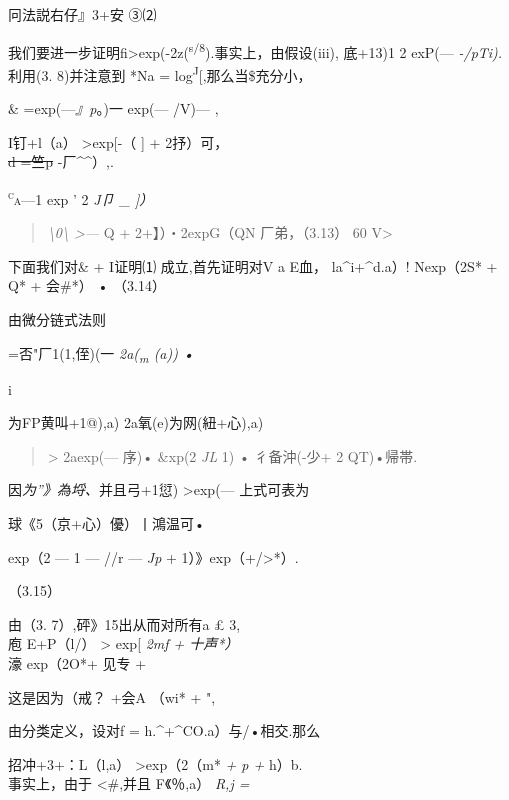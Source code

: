 冋法説右仔』3+安 ③⑵

我们要进一步证明\textbar{}fi\textbar{}\textgreater{}exp(-2z(\textsuperscript{s/8}).事实上，由假设(iii),
底+13)1 2 exP(--- \emph{-/pTi).}利用(3. 8)并注意到 *Na =
log\textsuperscript{J}{[}\textbar{}{]},那么当\$充分小，

\&\textbar{} =exp(---\emph{』p}。)一 exp(--- /V)--- ,

I钉+l（a）\textbar{} \textgreater{}exp{[}-（ {]} + 2抒）可，\\
\sout{d =竺p} -厂\^{}\^{}）,.

\textsc{\textsuperscript{c}a---}1 exp ' 2 \emph{J卩 \_ {]}）}

\begin{quote}
\emph{\textbackslash{}0\textbackslash{} \textgreater{}---} Q +
2+】）・2expG（QN 厂弟，（3.13） 60 V\textgreater{}
\end{quote}

下面我们对\& + I证明⑴ 成立,首先证明对V a E血， la\^{}i+\^{}d.a）!
Nexp（2S* + Q* + 会\#*） • （3.14）

由微分链式法则

=否"厂1(1,侄)(一 \emph{2a(\textsubscript{m} (a)) •}

i

为FP黄叫+1@),a) \textbar{}2a氧(e)为网(紐+心),a) \textbar{}

\begin{quote}
\textgreater{} 2aexp(--- 序)• \&xp(2 \emph{JL} 1) • 彳备沖(-少+ 2
QT)•帰帯.
\end{quote}

因\emph{为''》為埒、}并且\textbar{}弓+1愆)\textbar{}
\textgreater{}exp(--- 上式可表为

\textbar{}球《5（京+心）優）丨鴻温可•

exp（2 --- 1 --- //r --- \emph{Jp} + 1）》exp（+/\textgreater{}*）.

（3.15）

由（3. 7）,砰》15出从而对所有a £ 3,\\
庖 E+P（l/）\textbar{} \textgreater{} exp{[} \emph{2mf + 十声*）\\
}濠 exp（2O*+ 见专 +

这是因为（戒？ +会A （wi* + ",

由分类定义，设对f = h.\^{}+\^{}CO.a）与/•相交.那么

\textbar{}招冲+3+：L（l,a） \textbar{} \textgreater{}exp（2（m* \emph{+
p +} h）b.\\
事实上，由于 \textless{}\#,并且 \textbar{}F《％,a）\textbar{} \emph{R,j
=}

